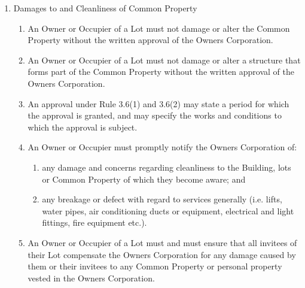 \documentclass{article}
\begin{document}
\begin{enumerate}[label=\arabic*.]
\begin{enumerate}[label=\arabic{enumi}.\arabic*.]
\begin{enumerate}[label=(\arabic*)]
\begin{enumerate}[label=(\arabic*)]
\begin{enumerate}[label=(\alph*)]
\end{enumerate}

\item  Owner and Occupiers indemnify and keep indemnified the Owners Corporation on a full indemnity basis for the costs of repairing any damage to the Common Property arising out of bringing their bicycles on to any Lot (for example, corridors).

\end{enumerate}

\item  Damages to and Cleanliness of Common Property

\begin{enumerate}[label=(\arabic*)]

\item  An Owner or Occupier of a Lot must not damage or alter the Common Property without the written approval of the Owners Corporation.

\item  An Owner or Occupier of a Lot must not damage or alter a structure that forms part of the Common Property without the written approval of the Owners Corporation.

\item  An approval under Rule 3.6(1) and 3.6(2) may state a period for which the approval is granted, and may specify the works and conditions to which the approval is subject.

\item  An Owner or Occupier must promptly notify the Owners Corporation of:

\begin{enumerate}[label=(\alph*)]

\item  any damage and concerns regarding cleanliness to the Building, lots or Common Property of which they become aware; and

\item  any breakage or defect with regard to services generally (i.e. lifts, water pipes, air conditioning ducts or equipment, electrical and light fittings, fire equipment etc.).

\end{enumerate}

\item  An Owner or Occupier of a Lot must and must ensure that all invitees of their Lot compensate the Owners Corporation for any damage caused by them or their invitees to any Common Property or personal property vested in the Owners Corporation.


\end{enumerate}
\end{enumerate}
\end{enumerate}
\end{enumerate}
\end{document}
